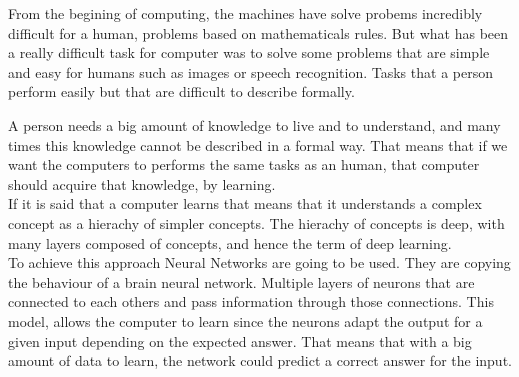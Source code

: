 From the begining of computing, the machines have solve probems incredibly difficult for a human, problems based on mathematicals rules. But what has been a really difficult task for computer was to solve some problems that are simple and easy for humans such as images or speech recognition. Tasks that a person perform easily but that are difficult to describe formally.

A person needs a big amount of knowledge to live and to understand, and many times this knowledge cannot be described in a formal way. That means that if we want the computers to performs the same tasks as an human, that computer should acquire that knowledge, by learning.\\

If it is said that a computer learns that means that it understands a complex concept as a hierachy of simpler concepts. The hierachy of concepts is deep, with many layers composed of concepts, and hence the term of deep learning.\\

To achieve this approach Neural Networks are going to be used. They are copying the behaviour of a brain neural network. Multiple layers of neurons that are connected to each others and pass information through those connections. This model, allows the computer to learn since the neurons adapt the output for a given input depending on the expected answer. That means that with a big amount of data to learn, the network could predict a correct answer for the input. \cite{deepbook}
